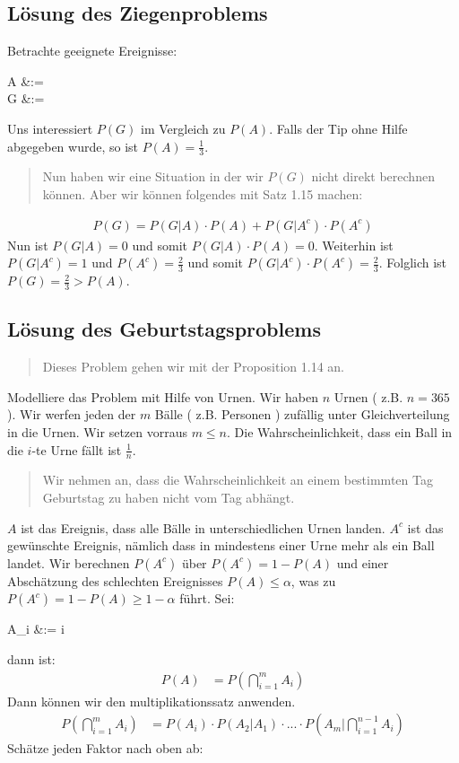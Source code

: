 \subsection{Lösung des Ziegenproblems}
Betrachte geeignete Ereignisse:
\begin{alignl*}
A &:=  \\ %
G &:= 
\end{alignl*}
Uns interessiert $P(G)$ im Vergleich zu $P(A)$. Falls der Tip ohne Hilfe abgegeben wurde, so ist $P(A)=\frac{1}{3}$.
\begin{quote}
Nun haben wir eine Situation in der wir $P(G)$ nicht direkt berechnen können. Aber wir können folgendes mit Satz 1.15 machen:\end{quote}
\begin{align*}
P(G)=P(G|A)\cdot P(A) + P(G|A^c)\cdot P(A^c)
\end{align*}
Nun ist $P(G|A)=0$ und somit $P(G|A)\cdot P(A) = 0$. Weiterhin ist $P(G|A^c)=1$ und $P(A^c)=\frac{2}{3}$ und somit %
$P(G|A^c)\cdot P(A^c) = \frac{2}{3}$. Folglich ist $P(G) = \frac{2}{3} > P(A)$.

\subsection{Lösung des Geburtstagsproblems}
\begin{quote}
Dieses Problem gehen wir mit der Proposition 1.14 an.
\end{quote}
Modelliere das Problem mit Hilfe von Urnen. Wir haben $n$ Urnen ( z.B. $n = 365$ ). Wir werfen jeden der $m$ Bälle ( z.B. %
Personen ) zufällig unter Gleichverteilung in die Urnen. Wir setzen vorraus $m \leq n$. Die Wahrscheinlichkeit, dass ein %
Ball in die $i$-te Urne fällt ist $\frac{1}{n}$.
\begin{quote}
Wir nehmen an, dass die Wahrscheinlichkeit an einem bestimmten Tag Geburtstag zu haben nicht vom Tag abhängt.
\end{quote}
$A$ ist das Ereignis, dass alle Bälle in unterschiedlichen Urnen landen. $A^c$ ist das gewünschte Ereignis, nämlich %
dass in mindestens einer Urne mehr als ein Ball landet.
Wir berechnen $P(A^c)$ über $P(A^c)=1-P(A)$ und einer Abschätzung des schlechten Ereignisses $P(A) \leq \alpha$, was zu %
$P(A^c) = 1-P(A) \geq 1-\alpha$ führt.
Sei:
\begin{alignl*}
A_i &:=  i 
\end{alignl*}
dann ist:
\begin{align*}
P(A) &= P \left ( \bigcap\limits_{i=1}^m A_i \right )
\end{align*}
Dann können wir den multiplikationssatz anwenden.
\begin{align*}
P \left ( \bigcap\limits_{i=1}^m A_i \right ) &= P(A_i) \cdot P(A_2|A_1) \cdot ... \cdot P(A_m|\bigcap\limits_{i=1}^{n-1} A_i )
\end{align*}
Schätze jeden Faktor nach oben ab:
